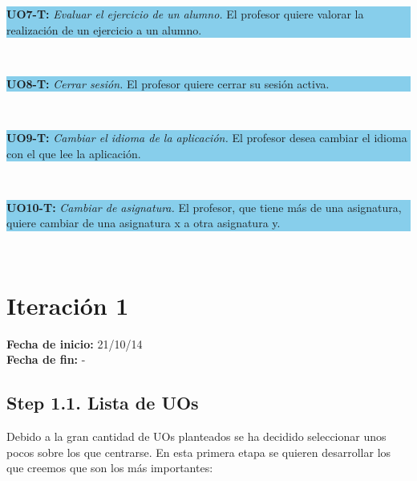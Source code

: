\vspace{0.1cm}

\colorbox{SkyBlue}{\parbox[c]{1.0\textwidth}{
\textbf{UO7-T:} \textit{Evaluar el ejercicio de un alumno.} El profesor quiere valorar la realización de un ejercicio a un alumno.\\
}}\\

\vspace{0.1cm}

\colorbox{SkyBlue}{\parbox[c]{1.0\textwidth}{
\textbf{UO8-T:} \textit{Cerrar sesión.} El profesor quiere cerrar su sesión activa.\\
}}\\

\vspace{0.1cm}

\colorbox{SkyBlue}{\parbox[c]{1.0\textwidth}{
\textbf{UO9-T:} \textit{Cambiar el idioma de la aplicación.} El profesor desea cambiar el idioma con el que lee la aplicación.\\
}}\\

\vspace{0.1cm}

\colorbox{SkyBlue}{\parbox[c]{1.0\textwidth}{
\textbf{UO10-T:} \textit{Cambiar de asignatura.} El profesor, que tiene más de una asignatura, quiere cambiar de una asignatura x a otra asignatura y.\\
}}\\


\section{Iteración 1}
\label{it1}

\begin{flushleft}
\textbf{Fecha de inicio:} 21/10/14\\
\textbf{Fecha de fin:} -\\
\end{flushleft}

\subsection{Step 1.1. Lista de UOs}
\label{it1:1.1}

Debido a la gran cantidad de UOs planteados se ha decidido seleccionar unos pocos sobre los que centrarse. En esta primera etapa se quieren desarrollar los que creemos que son los más importantes:

